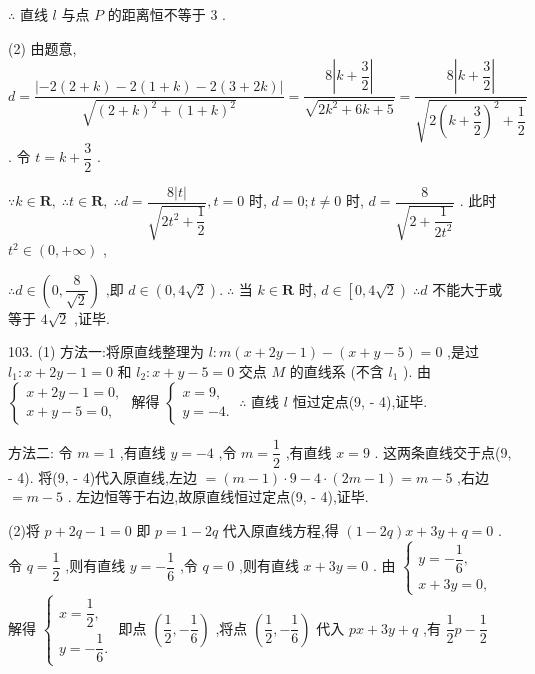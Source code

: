$\therefore$ 直线 $l$ 与点 $P$ 的距离恒不等于 3 .

(2) 由题意, $d = \dfrac{\left| -2\left( 2 + k\right)  - 2\left( 1 + k\right)  - 2\left( 3 + 2k\right) \right| }{\sqrt{{\left( 2 + k\right) }^{2} + {\left( 1 + k\right) }^{2}}} = \dfrac{8\left| {k + \dfrac{3}{2}}\right| }{\sqrt{2{k}^{2} + {6k} + 5}} = \dfrac{8\left| {k + \dfrac{3}{2}}\right| }{\sqrt{2{\left( k + \dfrac{3}{2}\right) }^{2} + \dfrac{1}{2}}}$ . 令 $t = k + \dfrac{3}{2}$ .

$\because k \in  \mathbf{R},\;\therefore t \in  \mathbf{R},\;\therefore d = \dfrac{8\left| t\right| }{\sqrt{2{t}^{2} + \dfrac{1}{2}}},t = 0$ 时, $d = 0;t \neq  0$ 时, $d = \dfrac{8}{\sqrt{2 + \dfrac{1}{2{t}^{2}}}}$ . 此时 ${t}^{2} \in  \left( {0, + \infty }\right)$ ,

$\therefore d \in  \left( {0,\dfrac{8}{\sqrt{2}}}\right)$ ,即 $d \in  \left( {0,4\sqrt{2}}\right) .\;\therefore$ 当 $k \in  \mathbf{R}$ 时, $d \in  \left\lbrack  {0,4\sqrt{2}}\right) \;\therefore d$ 不能大于或等于 $4\sqrt{2}$ ,证毕.

103. (1) 方法一:将原直线整理为 $l : m\left( {x + {2y} - 1}\right)  - \left( {x + y - 5}\right)  = 0$ ,是过 ${l}_{1} : x + {2y} - 1 = 0$ 和 ${l}_{2} : x + y - 5 = 0$ 交点 $M$ 的直线系 (不含 ${l}_{1}$ ). 由 $\left\{  \begin{array}{l} x + {2y} - 1 = 0, \\  x + y - 5 = 0, \end{array}\right.$ 解得 $\left\{  {\begin{array}{l} x = 9, \\  y =  - 4. \end{array}\;\therefore }\right.$ 直线 $l$ 恒过定点(9, - 4),证毕.

方法二: 令 $m = 1$ ,有直线 $y =  - 4$ ,令 $m = \dfrac{1}{2}$ ,有直线 $x = 9$ . 这两条直线交于点(9, - 4). 将(9, - 4)代入原直线,左边 $= \left( {m - 1}\right)  \cdot  9 - 4 \cdot  \left( {{2m} - 1}\right)  = m - 5$ ,右边 $= m - 5$ . 左边恒等于右边,故原直线恒过定点(9, - 4),证毕.

(2)将 $p + {2q} - 1 = 0$ 即 $p = 1 - {2q}$ 代入原直线方程,得 $\left( {1 - {2q}}\right) x + {3y} + q = 0$ . 令 $q = \dfrac{1}{2}$ ,则有直线 $y =  - \dfrac{1}{6}$ ,令 $q = 0$ ,则有直线 $x + {3y} = 0$ . 由 $\left\{  \begin{array}{l} y =  - \dfrac{1}{6}, \\  x + {3y} = 0, \end{array}\right.$ 解得 $\left\{  \begin{array}{l} x = \dfrac{1}{2}, \\  y =  - \dfrac{1}{6}. \end{array}\right.$ 即点 $\left( {\dfrac{1}{2}, - \dfrac{1}{6}}\right)$ ,将点 $\left( {\dfrac{1}{2}, - \dfrac{1}{6}}\right)$ 代入 ${px} + {3y} + q$ ,有 $\dfrac{1}{2}p - \dfrac{1}{2}$

